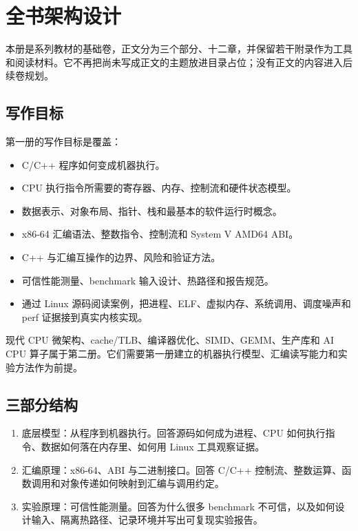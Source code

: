 \chapter*{全书架构设计}

本册是系列教材的基础卷，正文分为三个部分、十二章，并保留若干附录作为工具和阅读材料。它不再把尚未写成正文的主题放进目录占位；没有正文的内容进入后续卷规划。

\section*{写作目标}

第一册的写作目标是覆盖：

\begin{itemize}
  \item C/C++ 程序如何变成机器执行。
  \item CPU 执行指令所需要的寄存器、内存、控制流和硬件状态模型。
  \item 数据表示、对象布局、指针、栈和最基本的软件运行时概念。
  \item x86-64 汇编语法、整数指令、控制流和 System V AMD64 ABI。
  \item C++ 与汇编互操作的边界、风险和验证方法。
  \item 可信性能测量、benchmark 输入设计、热路径和报告规范。
  \item 通过 Linux 源码阅读案例，把进程、ELF、虚拟内存、系统调用、调度噪声和 perf 证据接到真实内核实现。
\end{itemize}

现代 CPU 微架构、cache/TLB、编译器优化、SIMD、GEMM、生产库和 AI CPU 算子属于第二册。它们需要第一册建立的机器执行模型、汇编读写能力和实验方法作为前提。

\section*{三部分结构}

\begin{enumerate}
  \item 底层模型：从程序到机器执行。回答源码如何成为进程、CPU 如何执行指令、数据如何落在内存里、如何用 Linux 工具观察证据。
  \item 汇编原理：x86-64、ABI 与二进制接口。回答 C/C++ 控制流、整数运算、函数调用和对象传递如何映射到汇编与调用约定。
  \item 实验原理：可信性能测量。回答为什么很多 benchmark 不可信，以及如何设计输入、隔离热路径、记录环境并写出可复现实验报告。
\end{enumerate}

